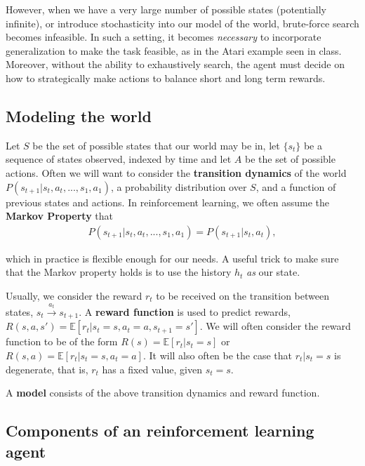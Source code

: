 \documentclass{article}
\newcommand{\E}{\mathbb{E}}                                        %
\begin{document}
However, when we have a very large number of possible states (potentially infinite), or introduce stochasticity into our model of the world, brute-force search becomes infeasible. In such a setting, it becomes \textit{necessary} to incorporate generalization to make the task feasible, as in the Atari example seen in class. Moreover, without the ability to exhaustively search, the agent must decide on how to strategically make actions to balance short and long term rewards.




\subsection{Modeling the world} \label{seq:modeling}

Let $S$ be the set of possible states that our world may be in, let $\{s_t\}$ be a sequence of states observed, indexed by time and let $A$ be the set of possible actions. Often we will want to consider the \textbf{transition dynamics} of the world $P(s_{t+1} | s_t, a_t, ..., s_1, a_1)$, a probability distribution over $S$, and a function of previous states and actions. In reinforcement learning, we often assume the \textbf{Markov Property} that 
\begin{align}
    P(s_{t+1} | s_t, a_t, ..., s_1, a_1) = P(s_{t+1} | s_t, a_t), 
\end{align}

which in practice is flexible enough for our needs. A useful trick to make sure that the Markov property holds is to use the history $h_t$ \textit{as} our state. 

Usually, we consider the reward $r_t$ to be received on the transition between states, $s_t \xrightarrow{a_t} s_{t+1}$. A \textbf{reward function} is used to predict rewards, $R(s,a,s') = \E[r_t | s_t=s, a_t=a, s_{t+1}=s']$. We will often consider the reward function to be of the form $R(s)=\E[r_t | s_t=s]$ or $R(s,a)=\E[r_t | s_t=s, a_t=a]$. It will also often be the case that $r_t | s_t=s$ is degenerate, that is, $r_t$ has a fixed value, given $s_t=s$.

A \textbf{model} consists of the above transition dynamics and reward function.



\subsection{Components of an reinforcement learning agent}
\end{document}
